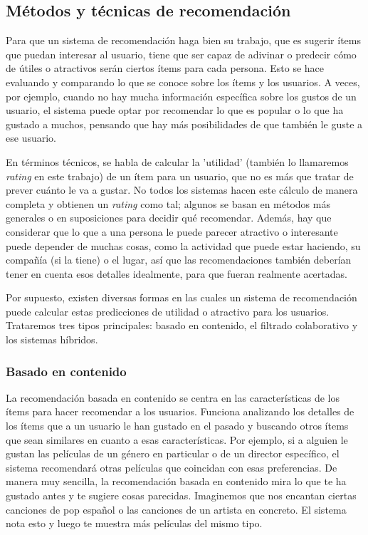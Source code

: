 \subsection{Métodos y técnicas de recomendación\label{SEC:METODOS_RECOMENDACION}}

Para que un sistema de recomendación haga bien su trabajo, que es sugerir ítems que puedan interesar al usuario, tiene que ser capaz de adivinar o predecir
 cómo de útiles o atractivos serán ciertos ítems para cada persona. Esto se hace evaluando y comparando lo que se conoce sobre los ítems y 
 los usuarios. A veces, por ejemplo, cuando no hay mucha información específica sobre los gustos de un usuario, el sistema puede optar por recomendar lo que es popular
  o lo que ha gustado a muchos, pensando que hay más posibilidades de que también le guste a ese usuario.

En términos técnicos, se habla de calcular la 'utilidad' (también lo llamaremos \textit{rating} en este trabajo) de un ítem para un usuario, que no es más
 que tratar de prever cuánto le va a gustar. No todos los sistemas hacen este cálculo de manera completa y obtienen un \textit{rating} como tal; algunos 
 se basan en métodos más generales o en suposiciones para decidir qué recomendar. Además, hay que considerar que lo que a una persona le puede parecer
 atractivo o interesante puede depender de muchas cosas, como la actividad que puede estar haciendo, su compañía (si la tiene) o el lugar, así que las recomendaciones 
 también deberían tener en cuenta esos detalles idealmente, para que fueran realmente acertadas.

 Por supuesto, existen diversas formas en las cuales un sistema de recomendación puede calcular estas predicciones de utilidad o atractivo para los usuarios.
 Trataremos tres tipos principales: basado en contenido, el filtrado colaborativo y los sistemas híbridos. 


 \subsubsection{Basado en contenido\label{SEC:RECOMENDADORES_CONTENIDO}}
 La recomendación basada en contenido se centra en las características de los ítems para hacer recomendar a los usuarios. Funciona analizando los 
 detalles de los ítems que a un usuario le han gustado en el pasado y buscando otros ítems que sean similares en cuanto a esas características. Por 
 ejemplo, si a alguien le gustan las películas de un género en particular o de un director específico, el sistema recomendará otras películas que 
 coincidan con esas preferencias. De manera muy sencilla, la recomendación basada en contenido mira lo que te ha gustado antes y te sugiere cosas parecidas. 
 Imaginemos que nos encantan ciertas canciones de pop español o las canciones de un artista en concreto. El sistema nota esto y luego te muestra más películas del mismo tipo.

